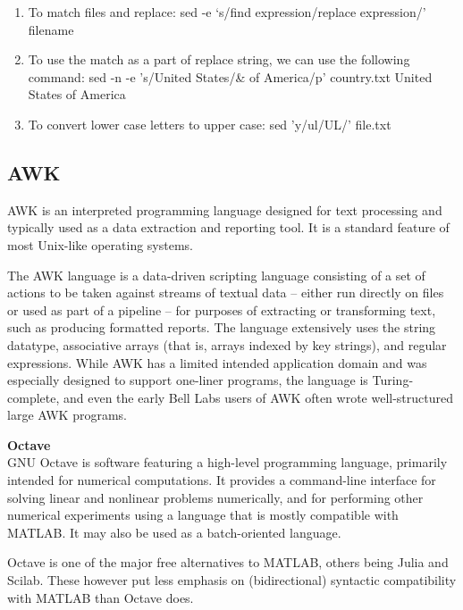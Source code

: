 \documentclass{beamer}
\begin{document}
    \begin{enumerate}
        \item
            To match files and replace:
                     sed  -e   ‘s/find expression/replace expression/’ filename
        \item
            To use the match as a part of replace string, we can use the following command:
                    sed -n -e  's/United States/\& of America/p' country.txt
                    United States of America
          \item
            To convert lower case letters to upper case:
                    sed 'y/ul/UL/' file.txt
  \end{enumerate}
    \begin{frame}
  \subsection{AWK}
AWK is an interpreted programming language designed for text processing and typically used as a data extraction and reporting tool. It is a standard feature of most Unix-like operating systems.

The AWK language is a data-driven scripting language consisting of a set of actions to be taken against streams of textual data – either run directly on files or used as part of a pipeline – for purposes of extracting or transforming text, such as producing formatted reports. The language extensively uses the string datatype, associative arrays (that is, arrays indexed by key strings), and regular expressions. While AWK has a limited intended application domain and was especially designed to support one-liner programs, the language is Turing-complete, and even the early Bell Labs users of AWK often wrote well-structured large AWK programs.
    \end{frame}
    \begin{frame}
    \textbf{Octave}\\
GNU Octave is software featuring a high-level programming language, primarily intended for numerical computations. It provides a command-line interface for solving linear and nonlinear problems numerically, and for performing other numerical experiments using a language that is mostly compatible with MATLAB. It may also be used as a batch-oriented language. 
\end{frame}
    \begin{frame}

Octave is one of the major free alternatives to MATLAB, others being Julia and Scilab. These however put less emphasis on (bidirectional) syntactic compatibility with MATLAB than Octave does.
\end{frame}
\end{document}
